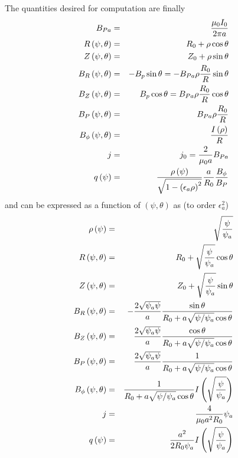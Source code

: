 \documentclass{article}
\begin{document}
The quantities desired for computation are finally 
\begin{eqnarray*}
B_{Pa} &=&\frac{\mu _{0}I_{0}}{2\pi a} \\
R\left( \psi ,\theta \right)  &=&R_{0}+\rho \cos \theta  \\
Z\left( \psi ,\theta \right)  &=&Z_{0}+\rho \sin \theta  \\
B_{R}\left( \psi ,\theta \right)  &=&-B_{p}\sin \theta =-B_{Pa}\rho \frac{%
R_{0}}{R}\sin \theta  \\
B_{Z}\left( \psi ,\theta \right)  &=&B_{p}\cos \theta =B_{Pa}\rho \frac{R_{0}%
}{R}\cos \theta  \\
B_{P}\left( \psi ,\theta \right)  &=&B_{Pa}\rho \frac{R_{0}}{R} \\
B_{\phi }\left( \psi ,\theta \right)  &=&\frac{I\left( \rho \right) }{R} \\
j &=&j_{0}=\frac{2}{\mu _{0}a}B_{Pa} \\
q\left( \psi \right)  &=&\frac{\rho \left( \psi \right) }{\sqrt{1-\left(
\epsilon _{a}\rho \right) ^{2}}}\frac{a}{R_{0}}\frac{B_{\phi }}{B_{P}}
\end{eqnarray*}
and can be expressed as a function of $\left( \psi ,\theta \right) $ as (to
order $\epsilon _{a}^{2}$) 
\begin{eqnarray*}
\rho \left( \psi \right)  &=&\sqrt{\frac{\psi }{\psi _{a}}} \\
R\left( \psi ,\theta \right)  &=&R_{0}+\sqrt{\frac{\psi }{\psi _{a}}}\cos
\theta  \\
Z\left( \psi ,\theta \right)  &=&Z_{0}+\sqrt{\frac{\psi }{\psi _{a}}}\sin
\theta  \\
B_{R}\left( \psi ,\theta \right)  &=&-\frac{2\sqrt{\psi _{a}\psi }}{a}\frac{%
\sin \theta }{R_{0}+a\sqrt{\psi /\psi _{a}}\cos \theta } \\
B_{Z}\left( \psi ,\theta \right)  &=&\frac{2\sqrt{\psi _{a}\psi }}{a}\frac{%
\cos \theta }{R_{0}+a\sqrt{\psi /\psi _{a}}\cos \theta } \\
B_{P}\left( \psi ,\theta \right)  &=&\frac{2\sqrt{\psi _{a}\psi }}{a}\frac{1%
}{R_{0}+a\sqrt{\psi /\psi _{a}}\cos \theta } \\
B_{\phi }\left( \psi ,\theta \right)  &=&\frac{1}{R_{0}+a\sqrt{\psi /\psi
_{a}}\cos \theta }I\left( \sqrt{\frac{\psi }{\psi _{a}}}\right)  \\
j &=&\frac{4}{\mu _{0}a^{2}R_{0}}\psi _{a} \\
q\left( \psi \right)  &=&\frac{a^{2}}{2R_{0}\psi _{a}}I\left( \sqrt{\frac{%
\psi }{\psi _{a}}}\right) 
\end{eqnarray*}
\end{document}
